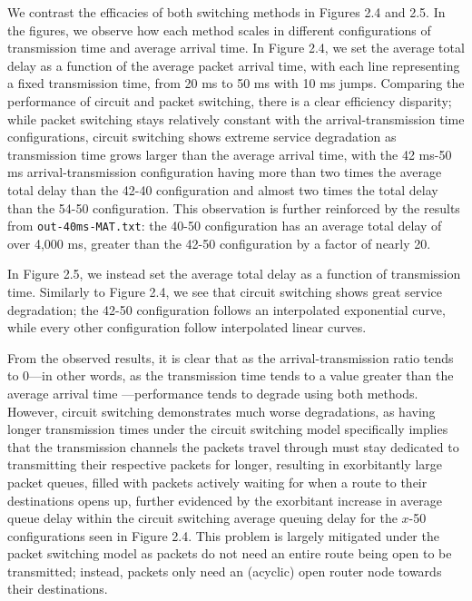\documentclass{article}
\begin{document}
  We contrast the efficacies of both switching methods in Figures 2.4 and 2.5. In the figures, we
  observe how each method scales in different configurations of transmission time and average
  arrival time. In Figure 2.4, we set the average total delay as a function of the average packet
  arrival time, with each line representing a fixed transmission time, from 20 ms to 50 ms with 10 ms jumps. Comparing the performance of circuit and packet switching, there is a clear efficiency
  disparity; while packet switching stays relatively constant with the arrival-transmission
  time configurations, circuit switching shows extreme service degradation as transmission time
  grows larger than the average arrival time, with the 42 ms-50 ms arrival-transmission
  configuration having more than two times the average total delay than the 42-40 configuration
  and almost two times the total delay than the 54-50 configuration. This observation is further
  reinforced by the results from \verb|out-40ms-MAT.txt|: the 40-50 configuration has an average
  total delay of over 4,000 ms, greater than the 42-50 configuration by a factor of nearly 20.

  In Figure 2.5, we instead set the average total delay as a function of transmission time.
  Similarly to Figure 2.4, we see that circuit switching shows great service degradation;
  the 42-50 configuration follows an interpolated exponential curve, while every other
  configuration follow interpolated linear curves.

  From the observed results, it is clear that as the arrival-transmission ratio tends to 0---in
  other words, as the transmission time tends to a value greater than the average arrival time
  ---performance tends to degrade using both methods. However, circuit switching demonstrates much
  worse degradations, as having longer transmission times under the circuit switching model
  specifically implies that the transmission channels the packets travel through must stay
  dedicated to transmitting their respective packets for longer, resulting in exorbitantly large
  packet queues, filled with packets actively waiting for when a route to their destinations
  opens up, further evidenced by the exorbitant increase in average queue delay within the circuit
  switching average queuing delay for the $x$-50 configurations seen in Figure 2.4. This problem is
  largely mitigated under the packet switching model as packets do not need an entire route being
  open to be transmitted; instead, packets only need an (acyclic) open router node towards their
  destinations.
\end{document}
